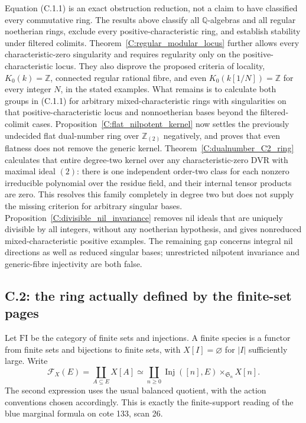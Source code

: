 \begin{remark}
\label{C:allrings_open}\label{C:allrings_gate}
Equation (C.1.1) is an exact obstruction reduction, not a claim to have
classified every commutative ring. The results above classify all
$\mathbb Q$-algebras and all regular noetherian rings, exclude every
positive-characteristic ring, and establish stability under filtered
colimits. Theorem~\ref{C:regular_modular_locus} further allows every
characteristic-zero singularity and requires regularity only on the
positive-characteristic locus. They also disprove the proposed criteria of locality,
$K_0(k)=\mathbb Z$, connected regular rational fibre, and even
$K_0(k[1/N])=\mathbb Z$ for every integer $N$, in the stated examples.
What remains is to calculate both groups in (C.1.1) for arbitrary
mixed-characteristic rings with singularities on that positive-characteristic
locus and nonnoetherian bases beyond the filtered-colimit cases.
Proposition~\ref{C:flat_nilpotent_kernel} now settles the previously
undecided flat dual-number ring over $\mathbb Z_{(2)}$ negatively,
and proves that even flatness does not remove the generic kernel.
Theorem~\ref{C:dualnumber_C2_ring} calculates that entire degree-two
kernel over any characteristic-zero DVR with maximal ideal $(2)$:
there is one independent order-two class for each nonzero irreducible
polynomial over the residue field, and their internal tensor products
are zero. This resolves this family completely in degree two but
does not supply the missing criterion for arbitrary singular bases.
Proposition~\ref{C:divisible_nil_invariance} removes nil ideals
that are uniquely divisible by all integers, without any noetherian
hypothesis, and gives nonreduced mixed-characteristic positive examples.
The remaining gap concerns integral nil directions as well as reduced
singular bases; unrestricted nilpotent invariance and generic-fibre
injectivity are both false.
\end{remark}

\subsection{C.2: the ring actually defined by the finite-set pages}

Let $\mathrm{FI}$ be the category of finite sets and injections. A finite
species is a functor from finite sets and bijections to finite sets, with
$X[I]=\varnothing$ for $|I|$ sufficiently large. Write
\[
 \mathcal F_X(E)=\coprod_{A\subseteq E}X[A]
 \simeq\coprod_{n\geq0}\operatorname{Inj}([n],E)
                 \mathbin{\times}_{\mathfrak S_n}X[n].
\]
The second expression uses the usual balanced quotient, with the action
conventions chosen accordingly. This is exactly the finite-support reading
of the blue marginal formula on cote 133, scan 26.

